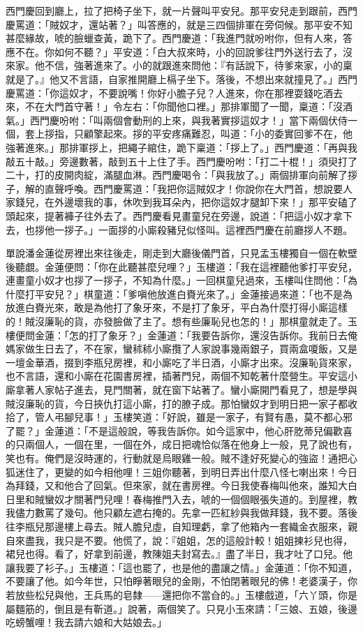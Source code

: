 西門慶回到廳上，拉了把椅子坐下，就一片聲叫平安兒。那平安兒走到跟前，西門慶罵道：「賊奴才，還站著？」叫答應的，就是三四個排軍在旁伺候。那平安不知甚麼緣故，唬的臉蠟查黃，跪下了。西門慶道：「我進門就吩咐你，但有人來，答應不在。你如何不聽？」平安道：「白大叔來時，小的回說爹往門外送行去了，沒來家。他不信，強著進來了。小的就跟進來問他：『有話說下，待爹來家，小的稟就是了。』他又不言語，自家推開廳上槅子坐下。落後，不想出來就撞見了。」西門慶罵道：「你這奴才，不要說嘴！你好小膽子兒？人進來，你在那裡耍錢吃酒去來，不在大門首守著！」令左右：「你聞他口裡。」那排軍聞了一聞，稟道：「沒酒氣。」西門慶吩咐：「叫兩個會動刑的上來，與我著實拶這奴才！」當下兩個伏侍一個，套上拶指，只顧擎起來。拶的平安疼痛難忍，叫道：「小的委實回爹不在，他強著進來。」那排軍拶上，把繩子綰住，跪下稟道：「拶上了。」西門慶道：「再與我敲五十敲。」旁邊數著，敲到五十上住了手。西門慶吩咐：「打二十棍！」須臾打了二十，打的皮開肉綻，滿腿血淋。西門慶喝令：「與我放了。」兩個排軍向前解了拶子，解的直聲呼喚。西門慶罵道：「我把你這賊奴才！你說你在大門首，想說要人家錢兒，在外邊壞我的事，休吹到我耳朵內，把你這奴才腿卸下來！」那平安磕了頭起來，提著褲子往外去了。西門慶看見畫童兒在旁邊，說道：「把這小奴才拿下去，也拶他一拶子。」一面拶的小廝殺豬兒似怪叫。這裡西門慶在前廳拶人不題。

單說潘金蓮從房裡出來往後走，剛走到大廳後儀門首，只見孟玉樓獨自一個在軟壁後聽覷。金蓮便問：「你在此聽甚麼兒哩？」玉樓道：「我在這裡聽他爹打平安兒，連畫童小奴才也拶了一拶子，不知為什麼。」一回棋童兒過來，玉樓叫住問他：「為什麼打平安兒？」棋童道：「爹嗔他放進白賚光來了。」金蓮接過來道：「也不是為放進白賚光來，敢是為他打了象牙來，不是打了象牙，平白為什麼打得小廝這樣的！賊沒廉恥的貨，亦發臉做了主了。想有些廉恥兒也怎的！」那棋童就走了。玉樓便問金蓮：「怎的打了象牙？」金蓮道：「我要告訴你，還沒告訴你。我前日去俺媽家做生日去了，不在家，蠻秫秫小廝攬了人家說事幾兩銀子，買兩盒嗄飯，又是一壇金華酒，掇到李瓶兒房裡，和小廝吃了半日酒，小廝才出來。沒廉恥貨來家，也不言語，還和小廝在花園書房裡，插著門兒，兩個不知乾著什麼營生。平安這小廝拿著人家帖子進去，見門關著，就在窗下站著了。蠻小廝開門看見了，想是學與賊沒廉恥的貨，今日挾仇打這小廝，打的膫子成。那怕蠻奴才到明日把一家子都收拾了，管人弔腳兒事！」玉樓笑道：「好說，雖是一家子，有賢有愚，莫不都心邪了罷？」金蓮道：「不是這般說，等我告訴你。如今這家中，他心肝肐蒂兒偏歡喜的只兩個人，一個在里，一個在外，成日把魂恰似落在他身上一般，見了說也有，笑也有。俺們是沒時運的，行動就是烏眼雞一般。賊不逢好死變心的強盜！通把心狐迷住了，更變的如今相他哩！三姐你聽著，到明日弄出什麼八怪七喇出來！今日為拜錢，又和他合了回氣。但來家，就在書房裡。今日我使春梅叫他來，誰知大白日里和賊蠻奴才關著門兒哩！春梅推門入去，唬的一個個眼張失道的。到屋裡，教我儘力數罵了幾句。他只顧左遮右掩的。先拿一匹紅紗與我做拜錢，我不要。落後往李瓶兒那邊樓上尋去。賊人膽兒虛，自知理虧，拿了他箱內一套織金衣服來，親自來盡我，我只是不要。他慌了，說：『姐姐，怎的這般計較！姐姐揀衫兒也得，裙兒也得。看了，好拿到前邊，教陳姐夫封寫去。』盡了半日，我才吐了口兒。他讓我要了衫子。」玉樓道：「這也罷了，也是他的盡讓之情。」金蓮道：「你不知道，不要讓了他。如今年世，只怕睜著眼兒的金剛，不怕閉著眼兒的佛！老婆漢子，你若放些松兒與他，王兵馬的皂隸——還把你不當㒲的。」玉樓戲道，「六丫頭，你是屬麵筋的，倒且是有靳道。」說著，兩個笑了。只見小玉來請：「三娘、五娘，後邊吃螃蟹哩！我去請六娘和大姑娘去。」

